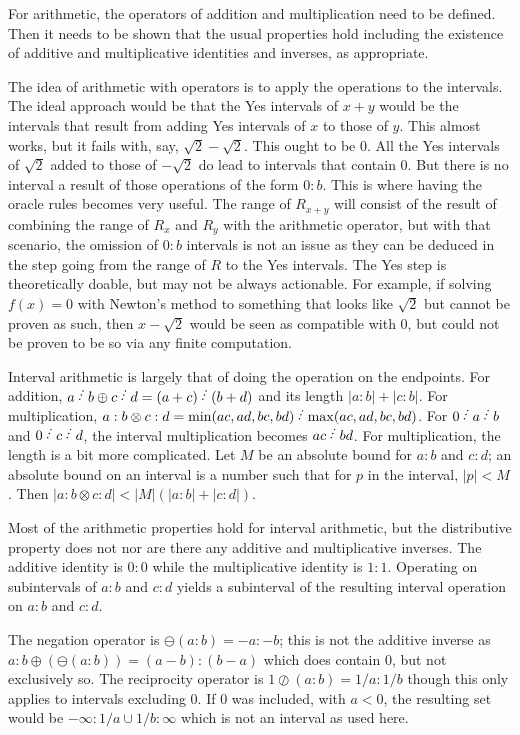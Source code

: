\documentclass[12pt]{article}
\begin{document}
For arithmetic, the operators of addition and multiplication need to be defined. Then it needs to be shown that the usual properties hold including the existence of additive and multiplicative identities and inverses, as appropriate. 

The idea of arithmetic with operators is to apply the operations to the intervals. The ideal approach would be that the Yes intervals of $x+y$ would be the intervals that result from adding Yes intervals of $x$ to those of $y$. This almost works, but it fails with, say, $\sqrt{2} - \sqrt{2}$. This ought to be 0. All the Yes intervals of $\sqrt{2}$ added to those of $-\sqrt{2}$ do lead to intervals that contain 0. But there is no interval a result of those operations of the form $0:b$. This is where having the oracle rules becomes very useful. The range of $R_{x+y}$ will consist of the result of combining the range of $R_x$ and $R_y$ with the arithmetic operator, but with that scenario, the omission of $0:b$ intervals is not an issue as they can be deduced in the step going from the range of $R$ to the Yes intervals. The Yes step is theoretically doable, but may not be always actionable. For example, if solving $f(x)=0$ with Newton's method to something that looks like $\sqrt{2}$ but cannot be proven as such, then $x - \sqrt{2}$ would be seen as compatible with 0, but could not be proven to be so via any finite computation. 

Interval arithmetic is largely that of doing the operation on the endpoints. For addition, $a \lte b \oplus c \lte d = (a+c) \lte (b+d)$ and its length $|a:b|+|c:b|$. For multiplication, $a:b \otimes c:d = \min(ac, ad, bc, bd)\lte \max(ac, ad, bc, bd)$. For $0 \lte a \lte b$ and $0 \lte c \lte d$, the interval multiplication becomes $ac \lte bd$. For multiplication, the length is a bit more complicated. Let $M$ be an absolute bound for $a:b$ and $c:d$; an absolute bound on an interval is a number such that for $p$ in the interval, $|p| < M$. Then $|a:b \otimes c:d| < |M|(|a:b| + |c:d|)$. 

Most of the arithmetic properties hold for interval arithmetic, but the distributive property does not nor are there any additive and multiplicative inverses. The additive identity is $0:0$ while the multiplicative identity is $1:1$. Operating on subintervals of $a:b$ and $c:d$ yields a subinterval of the resulting interval operation on $a:b$ and $c:d$. 

The negation operator is $\ominus(a:b) = -a:-b$; this is not the additive inverse as $a:b \oplus (\ominus(a :b )) = (a-b):(b-a)$ which does contain 0, but not exclusively so. The reciprocity operator is $1 \oslash (a:b) = 1/a : 1/b$ though this only applies to intervals excluding 0. If 0 was included, with $a < 0$, the resulting set would be $-\infty:1/a \cup 1/b : \infty $ which is not an interval as used here.
\end{document}
